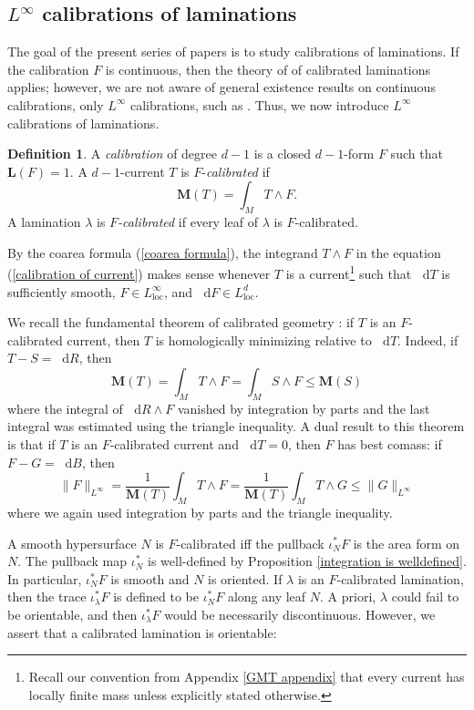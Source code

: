 \documentclass[reqno,11pt]{amsart}
\newcommand*\dif{\mathop{}\!\mathrm{d}}
\newcommand{\Mass}{\mathbf M}
\newcommand{\Comass}{\mathbf L}
\newcommand{\dfn}[1]{\emph{#1}\index{#1}}
\newcommand{\loc}{\mathrm{loc}}
\theoremstyle{definition}
\newtheorem{definition}[theorem]{Definition}
\numberwithin{equation}{section}
\begin{document}
\subsection{\texorpdfstring{$L^\infty$}{L-infinity} calibrations of laminations}\label{L infinity calibrations}
The goal of the present series of papers is to study calibrations of laminations.
If the calibration $F$ is continuous, then the theory of \cite{bangert_cui_2017} of calibrated laminations applies; however, we are not aware of general existence results on continuous calibrations, only $L^\infty$ calibrations, such as \cite[\S4.12]{Federer1974}.
Thus, we now introduce $L^\infty$ calibrations of laminations.

\begin{definition}
A \dfn{calibration} of degree $d - 1$ is a closed $d - 1$-form $F$ such that $\Comass(F) = 1$.
A $d - 1$-current $T$ is $F$-\dfn{calibrated} if 
\begin{equation}\label{calibration of current}
\Mass(T) = \int_M T \wedge F.
\end{equation}
A lamination $\lambda$ is \dfn{$F$-calibrated} if every leaf of $\lambda$ is $F$-calibrated.
\end{definition}

By the coarea formula (\ref{coarea formula}), the integrand $T \wedge F$ in the equation (\ref{calibration of current}) makes sense whenever $T$ is a current\footnote{Recall our convention from Appendix \ref{GMT appendix} that every current has locally finite mass unless explicitly stated otherwise.} such that $\dif T$ is sufficiently smooth, $F \in L^\infty_\loc$, and $\dif F \in L^d_\loc$.

We recall the fundamental theorem of calibrated geometry \cite{Harvey82}: if $T$ is an $F$-calibrated current, then $T$ is homologically minimizing relative to $\dif T$.
Indeed, if $T - S = \dif R$, then 
$$\Mass(T) = \int_M T \wedge F = \int_M S \wedge F \leq \Mass(S)$$
where the integral of $\dif R \wedge F$ vanished by integration by parts and the last integral was estimated using the triangle inequality.
A dual result to this theorem is that if $T$ is an $F$-calibrated current and $\dif T = 0$, then $F$ has best comass: if $F - G = \dif B$, then 
$$\|F\|_{L^\infty} = \frac{1}{\Mass(T)} \int_M T \wedge F = \frac{1}{\Mass(T)} \int_M T \wedge G \leq \|G\|_{L^\infty}$$
where we again used integration by parts and the triangle inequality.

A smooth hypersurface $N$ is $F$-calibrated iff the pullback $\iota_N^* F$ is the area form on $N$.
The pullback map $\iota_N^*$ is well-defined by Proposition \ref{integration is welldefined}.
In particular, $\iota_N^* F$ is smooth and $N$ is oriented.
If $\lambda$ is an $F$-calibrated lamination, then the trace $\iota_\lambda^* F$ is defined to be $\iota_N^* F$ along any leaf $N$.
A priori, $\lambda$ could fail to be orientable, and then $\iota_\lambda^* F$ would be necessarily discontinuous.
However, we assert that a calibrated lamination is orientable:
\end{document}
